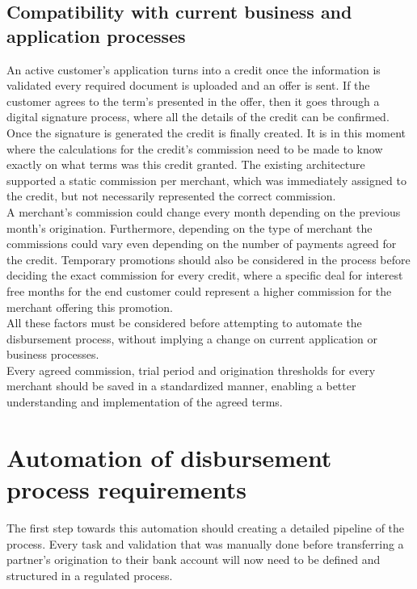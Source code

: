 \subsection{Compatibility with current business and application processes}
An active customer’s application turns into a credit once the information is validated every required document is uploaded and an offer is sent. If the customer agrees to the term’s presented in the offer, then it goes through a digital signature process, where all the details of the credit can be confirmed. Once the signature is generated the credit is finally created. It is in this moment where the calculations for the credit’s commission need to be made to know exactly on what terms was this credit granted. The existing architecture supported a static commission per merchant, which was immediately assigned to the credit, but not necessarily represented the correct commission.\\

A merchant’s commission could change every month depending on the previous month’s origination. Furthermore, depending on the type of merchant the commissions could vary even depending on the number of payments agreed for the credit. Temporary promotions should also be considered in the process before deciding the exact commission for every credit, where a specific deal for interest free months for the end customer could represent a higher commission for the merchant offering this promotion.\\

All these factors must be considered before attempting to automate the disbursement process, without implying a change on current application or business processes.\\

Every agreed commission, trial period and origination thresholds for every merchant should be saved in a standardized manner, enabling a better understanding and implementation of the agreed terms.

\section{Automation of disbursement process requirements}
The first step towards this automation should creating a detailed pipeline of the process. Every task and validation that was manually done before transferring a partner’s origination to their bank account will now need to be defined and structured in a regulated process.\\

